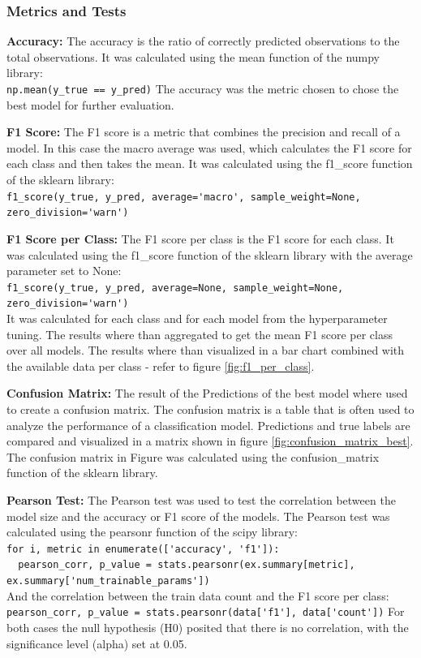 \subsubsection{Metrics and Tests}

\textbf{Accuracy:} The accuracy is the ratio of correctly predicted observations to the total observations.
It was calculated using the mean function of the numpy library:\\ 
\lstinline{np.mean(y_true == y_pred)}
The accuracy was the metric chosen to chose the best model for further evaluation.

\textbf{F1 Score:} The F1 score is a metric that combines the precision and recall of a model. In this
case the macro average was used, which calculates the F1 score for each class and then takes the mean.
It was calculated using the f1\_score function of the sklearn library:\\ 
\lstinline{f1_score(y_true, y_pred, average='macro', sample_weight=None, zero_division='warn')}

\textbf{F1 Score per Class:} The F1 score per class is the F1 score for each class. It was calculated
using the f1\_score function of the sklearn library with the average parameter set to None:\\
\lstinline{f1_score(y_true, y_pred, average=None, sample_weight=None, zero_division='warn')}\\
It was calculated for each class and for each model from the hyperparameter tuning. The results
where than aggregated to get the mean F1 score per class over all models. The results where
than visualized in a bar chart combined with the available data per class - refer to
figure \ref{fig:f1_per_class}.

\textbf{Confusion Matrix:} The result of the Predictions of the best model where used to create a confusion matrix.
The confusion matrix is a table that is often used to analyze the performance of a classification model.
Predictions and true labels are compared and visualized in a matrix shown in figure \ref{fig:confusion_matrix_best}. 
The confusion matrix in Figure was calculated using the confusion\_matrix function of the sklearn library.

\textbf{Pearson Test:} The Pearson test was used to test the correlation between the model size and the accuracy
or F1 score of the models. The Pearson test was calculated using the pearsonr function of the scipy library:\\
\lstinline{for i, metric in enumerate(['accuracy', 'f1']):}\\
\lstinline{  pearson_corr, p_value = stats.pearsonr(ex.summary[metric], ex.summary['num_trainable_params'])}\\
And the correlation between the train data count and the F1 score per class:\\
\lstinline{pearson_corr, p_value = stats.pearsonr(data['f1'], data['count'])}
For both cases the null hypothesis (H0) posited that there is no correlation, with the significance level (alpha) set at 0.05.
